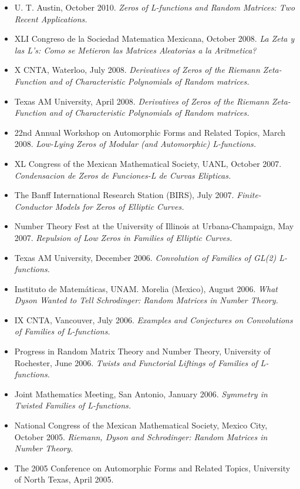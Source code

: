 \documentclass[11pt,a4paper,ragged2e,withhyper]{altacv}
\begin{document}
{\begin{itemize}
  \emph{Funciones Zeta y L: Que son y para que sirven?}
\item U. T. Austin, October 2010.
  \emph{Zeros of L-functions and Random Matrices: Two Recent Applications.}
\item XLI Congreso de la Sociedad Matematica Mexicana, October 2008.
  \emph{La Zeta y las L's: Como se Metieron las Matrices Aleatorias a la Aritmetica?}
\item X CNTA, Waterloo, July 2008.
  \emph{Derivatives of Zeros of the Riemann Zeta-Function and of Characteristic Polynomials of Random matrices.}
\item Texas AM University, April 2008.
  \emph{Derivatives of Zeros of the Riemann Zeta-Function and of Characteristic Polynomials of Random matrices.}
\item 22nd Annual Workshop on Automorphic Forms and Related Topics, March 2008.
  \emph{Low-Lying Zeros of Modular (and Automorphic) L-functions.}
\item XL Congress of the Mexican Mathematical Society, UANL, October 2007.
  \emph{Condensacion de Zeros de Funciones-L de Curvas Elipticas.}
\item The Banff International Research Station (BIRS), July 2007.
  \emph{Finite-Conductor Models for Zeros of Elliptic Curves.}
\item Number Theory Fest at the University of Illinois at Urbana-Champaign, May 2007.
  \emph{Repulsion of Low Zeros in Families of Elliptic Curves.}
\item Texas AM University, December 2006.
  \emph{Convolution of Families of GL(2) L-functions.}
\item Instituto de Matemáticas, UNAM. Morelia (Mexico), August 2006.
  \emph{What Dyson Wanted to Tell Schrodinger: Random Matrices in Number Theory.}
\item IX CNTA, Vancouver, July 2006.
  \emph{Examples and Conjectures on Convolutions of Families of L-functions.}
\item Progress in Random Matrix Theory and Number Theory, University of Rochester, June 2006.
  \emph{Twists and Functorial Liftings of Families of L-functions.}
\item Joint Mathematics Meeting, San Antonio, January 2006.
  \emph{Symmetry in Twisted Families of L-functions.}
\item National Congress of the Mexican Mathematical Society, Mexico City, October 2005.
  \emph{Riemann, Dyson and Schrodinger: Random Matrices in Number Theory.}
\item The 2005 Conference on Automorphic Forms and Related Topics, University of North Texas, April 2005.

\end{itemize}}
\end{document}
